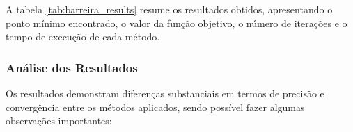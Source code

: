 \documentclass[a4paper, 12pt]{article}
\begin{document}
A tabela \ref{tab:barreira_results} resume os resultados obtidos, apresentando o ponto mínimo encontrado, o valor da função objetivo, o número de iterações e o tempo de execução de cada método.

\begin{table}[h!]
    \centering
    \caption{Resultados dos Métodos OSR para o Método de Barreira}
    \label{tab:barreira_results}
\end{table}

\subsubsection*{Análise dos Resultados}

Os resultados demonstram diferenças substanciais em termos de precisão e convergência entre os métodos aplicados, sendo possível fazer algumas observações importantes:
\end{document}
